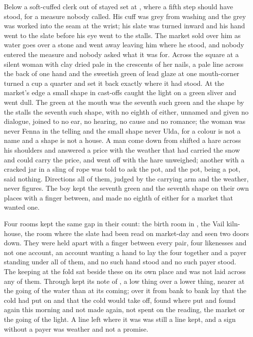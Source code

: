 \scenebreak

Below  a soft-cuffed clerk out of  stayed set at , where a fifth step should have stood, for a measure nobody called. His cuff was grey from washing and the grey was worked into the seam at the wrist; his slate was turned inward and his hand went to the slate before his eye went to the stalls. The market sold over him as water goes over a stone and went away leaving him where he stood, and nobody entered the measure and nobody asked what it was for. Across the square at  a silent woman with clay dried pale in the crescents of her nails, a pale line across the back of one hand and the sweetish green of lead glaze at one mouth-corner turned a cup a quarter and set it back exactly where it had stood. At the market's edge a small shape in cast-offs caught the light on a green sliver and went dull. The green at the mouth was the seventh such green and the shape by the stalls the seventh such shape, with no eighth of either, unnamed and given no dialogue, joined to no ear, no hearing, no cause and no romance; the woman was never Fenna in the telling and the small shape never Ulda, for a colour is not a name and a shape is not a house. A man come down from  shifted a hare across his shoulders and answered a price with the weather that had carried the snow and could carry the price, and went off with the hare unweighed; another with a cracked jar in a sling of rope was told to ask the pot, and the pot, being a pot, said nothing. Directions all of them, judged by the carrying arm and the weather, never figures. The boy kept the seventh green and the seventh shape on their own places with a finger between, and made no eighth of either for a market that wanted one.

Four rooms kept the same gap in their count: the birth room in , the Vail kiln-house, the room where the slate had been read on market-day and  seen two doors down. They were held apart with a finger between every pair, four likenesses and not one account, an account wanting a hand to lay the four together and a payer standing under all of them, and no such hand stood and no such payer stood. The keeping at the fold sat beside these on its own place and was not laid across any of them. Through   kept its note of , a low thing over a lower thing, nearer at the going of the water than at its coming; over it from bank to bank lay  that the cold had put on and that the cold would take off, found where put and found again this morning and not made again, not spent on the reading, the market or the going of the light. A line left where it was was still a line kept, and a sign without a payer was weather and not a promise.

